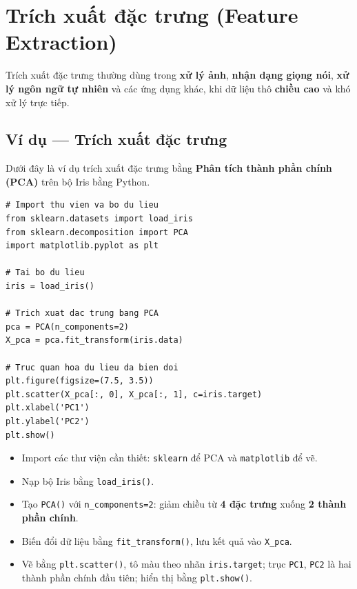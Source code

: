 \section{Trích xuất đặc trưng (Feature Extraction)}
\label{sec:feature-extraction}

\begin{dinhnghia}[title={Trích xuất đặc trưng}]
Trích xuất đặc trưng thường dùng trong \textbf{xử lý ảnh}, \textbf{nhận dạng giọng nói}, \textbf{xử lý ngôn ngữ tự nhiên} và các ứng dụng khác, khi dữ liệu thô \textbf{chiều cao} và khó xử lý trực tiếp.
\end{dinhnghia}

\subsection{Ví dụ --- Trích xuất đặc trưng}

\begin{dongco}[title={PCA trên bộ Iris}]
Dưới đây là ví dụ trích xuất đặc trưng bằng \textbf{Phân tích thành phần chính (PCA)} trên bộ Iris bằng Python.
\end{dongco}

\begin{vidu}[title={Mã Python đầy đủ}]
\begin{lstlisting}
# Import thu vien va bo du lieu
from sklearn.datasets import load_iris
from sklearn.decomposition import PCA
import matplotlib.pyplot as plt

# Tai bo du lieu
iris = load_iris()

# Trich xuat dac trung bang PCA
pca = PCA(n_components=2)
X_pca = pca.fit_transform(iris.data)

# Truc quan hoa du lieu da bien doi
plt.figure(figsize=(7.5, 3.5))
plt.scatter(X_pca[:, 0], X_pca[:, 1], c=iris.target)
plt.xlabel('PC1')
plt.ylabel('PC2')
plt.show()
\end{lstlisting}
\end{vidu}

\begin{phuongphap}[title={Giải thích từng bước trong mã}]
\begin{itemize}
  \item Import các thư viện cần thiết: \texttt{sklearn} để PCA và \texttt{matplotlib} để vẽ.
  \item Nạp bộ Iris bằng \texttt{load\_iris()}.
  \item Tạo \texttt{PCA()} với \texttt{n\_components=2}: giảm chiều từ \textbf{4 đặc trưng} xuống \textbf{2 thành phần chính}.
  \item Biến đổi dữ liệu bằng \texttt{fit\_transform()}, lưu kết quả vào \texttt{X\_pca}.
  \item Vẽ bằng \texttt{plt.scatter()}, tô màu theo nhãn \texttt{iris.target}; trục \texttt{PC1}, \texttt{PC2} là hai thành phần chính đầu tiên; hiển thị bằng \texttt{plt.show()}.
\end{itemize}
\end{phuongphap}


